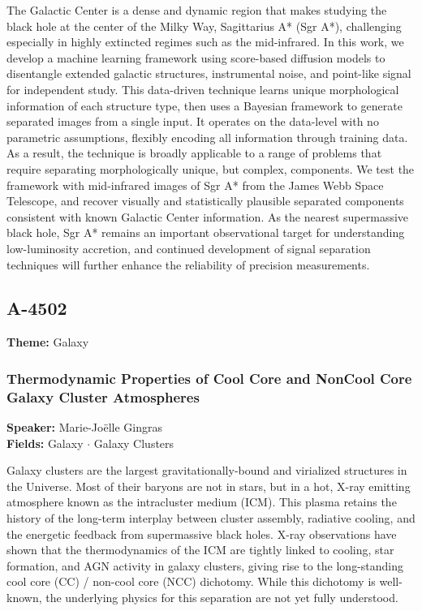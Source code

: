 The Galactic Center is a dense and dynamic region that makes studying the black hole at the center of the Milky Way, Sagittarius A* (Sgr A*), challenging especially in highly extincted regimes such as the mid-infrared. In this work, we develop a machine learning framework using score-based diffusion models to disentangle extended galactic structures, instrumental noise, and point-like signal for independent study. This data-driven technique learns unique morphological information of each structure type, then uses a Bayesian framework to generate separated images from a single input. It operates on the data-level with no parametric assumptions, flexibly encoding all information through training data. As a result, the technique is broadly applicable to a range of problems that require separating morphologically unique, but complex, components. We test the framework with mid-infrared images of Sgr A* from the James Webb Space Telescope, and recover visually and statistically plausible separated components consistent with known Galactic Center information. As the nearest supermassive black hole, Sgr A* remains an important observational target for understanding low-luminosity accretion, and continued development of signal separation techniques will further enhance the reliability of precision measurements.

\subsection*{A-4502}
\textbf{Theme:} Galaxy

\hypertarget{abstract-talk-316}{}\label{abstract-page-talk-316}
\subsubsection*{Thermodynamic Properties of Cool Core and NonCool Core Galaxy Cluster Atmospheres}
\textbf{Speaker:} Marie-Joëlle Gingras\\
\textbf{Fields:} Galaxy $\cdot$ Galaxy Clusters

Galaxy clusters are the largest gravitationally-bound and virialized structures in the Universe. Most of their baryons are not in stars, but in a hot, X-ray emitting atmosphere known as the intracluster medium (ICM). This plasma retains the history of the long-term interplay between cluster assembly, radiative cooling, and the energetic feedback from supermassive black holes. X-ray observations have shown that the thermodynamics of the ICM are tightly linked to cooling, star formation, and AGN activity in galaxy clusters, giving rise to the long-standing cool core (CC) / non-cool core (NCC) dichotomy. While this dichotomy is well-known, the underlying physics for this separation are not yet fully understood.

